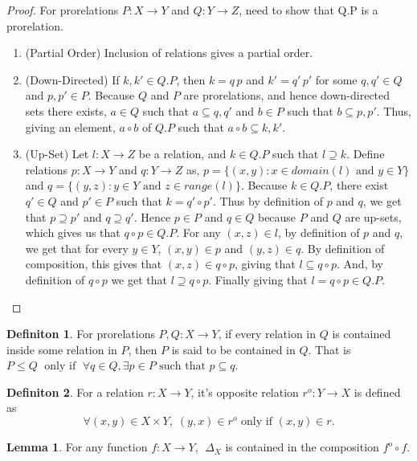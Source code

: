 \documentclass[18pt,a4paper]{article}
\theoremstyle{definition}
\newtheorem{definition}{Definiton}[section]
\newtheorem{lemma}{Lemma}[definition]
\begin{document}
\begin{proof}
	For prorelations $P:X \to Y$ and $Q:Y \to Z$, need to show that Q.P is a prorelation.
	\begin{enumerate}[label=(\roman*)]
		\item (Partial Order) Inclusion of relations gives a partial order.
		\item (Down-Directed) If $k,k' \in Q.P$, then $k=q\,p$ and $k'=q'\,p'$ for some
		$q,q' \in Q$ and $p,p' \in P$. Because $Q$ and $P$ are prorelations,
		and hence down-directed sets there exists, $a \in Q$ such that
		$ a\subseteq q,q'$ and $b \in P$ such that $b \subseteq p,p'$. Thus,
		giving an element, $a\circ b$ of $Q.P$ such that $a \circ b \subseteq k, k'$.
	\item (Up-Set) Let $l:X \to Z$ be a relation, and $k \in Q.P$ such that $l \supseteq k$.
		Define relations $ p:X \to Y $ and $q:Y \to Z$ as,
		$p=\{(x,y): x \in domain(l) \text{ and } y \in Y\}$ and
		$q=\{(y,z):  y \in Y \text{ and } z \in range(l)\}$.
		Because $k\in Q.P$, there exist $q'\in Q$ and $p' \in P$ such that
		$k = q' \circ p'$. Thus by definition of $p$ and $q$, we get that
		$p \supseteq p'$ and $q \supseteq q'$. Hence $p \in P$ and $q \in Q$ because
		$P$ and $Q$ are up-sets, which gives us that $q\circ p \in Q.P$.
		For any $(x,z) \in l$, by definition
		of $p$ and $q$, we get that for every $y \in Y$, $(x,y) \in p$ and
		$(y,z) \in q $. By
		definition of composition, this gives that $(x,z) \in q \circ p$,
		giving that $l \subseteq q \circ p$. And, by definition
		of $q \circ p$ we get that $l \supseteq q \circ p$. Finally giving that
		$l=q \circ p \in Q.P$.
	\end{enumerate}
\end{proof}
\begin{definition} %
	For prorelations $P,Q:X\to Y$, if every relation in $Q$ is contained inside some
	relation in $P$, then $P$ is said to be contained in $Q$.
	That is $P \leq Q \;\text{ only if }\;
	\forall q \in Q, \exists p \in P \text{ such that } p \subseteq q$.
\end{definition}
\begin{definition} %
	For a relation $r:X \to Y$, it's opposite relation $r^o:Y \to X$ is defined as
	\[ \forall (x,y)\in X \times Y, \; (y,x) \in r^o \text{ only if } (x,y)\in r  .\]
\end{definition}
\begin{lemma}
	For any function $f:X \to Y$, $\; \Delta_X$ is contained in the composition $ f^o \circ f$.
\end{lemma}
\end{document}
